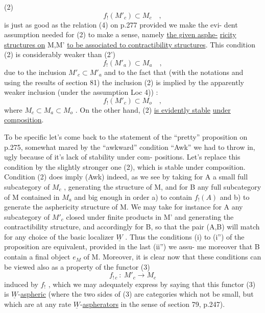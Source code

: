
(2) \[ f_!(M'_c) \subset M_c \quad , \]
is just as good as the relation (4) on p.277\hand{,} provided we make the evi-%
dent assumption needed for (2) to make a sense,  namely \uline{the given asphe-}%
\uline{ricity structures on} M,M' \uline{to be associated to contractibility structures}.
This condition (2) is \hand{(}considerably\hand{!)} weaker than
(2') \[ f_!(M'_a) \subset M_a \quad , \]
due to the inclusion $M'_c \subset M'_a$ and to the fact that (with the notations
and using the results of section 81)  the inclusion (2) is implied by
the apparently weaker inclusion (under the assumption  Loc 4)) :
\[ f_!(M'_c) \subset M_o \quad , \]
where  $M_c \subset M_a \subset M_o$ .  On the other hand,  (2)  \uline{is evidently stable}
\uline{under composition}.

To be specific let's come back to the statement of the ``pretty''
proposition on p.275,  somewhat mared by the ``awkward'' condition ``Awk''
we had to throw in,  ugly because of it's lack of stability under com-%
positions.  Let's replace this condition by the slightly stronger one
(2),  which is stable under composition.  Condition (2) does imply
(Awk) indeed,  as we see by taking for A a small full subcategory of
$M_c$ ,  generating the  structure of M,  and for B any
full subcategory of M contained in $M_a$ and big enough in order  a) to
contain $f_!(A)$  and  b)  to generate the asphericity structure of M.
We may take for instance for A any subcategory of $M'_c$  closed under
finite products in M' and generating the contractibility structure,
and accordingly for B,  so that the pair (A,B) will match for any
choice of the basic localizer $\underline{W}$ .  Thus the  conditions  (i) to (i'')
of the proposition are equivalent,  provided in the last (ii'') we assu-%
me moreover that B contain a final object $e_M$ of M.  Moreover,  it is
clear now that these conditions can be viewed also as a property of the
functor
(3) \[ f_{!\,c} \ : \ M'_c \longrightarrow M_c \]
induced by $f_!$ ,  which we may adequately express by saying that this
functor (3)  is $\underline{W}$-\uline{aspheric} (where the two sides of (3) are categories
which  not be small,  but which are at any rate $\underline{W}$-\uline{aspherators}  in
the sense of section 79, p.247).

